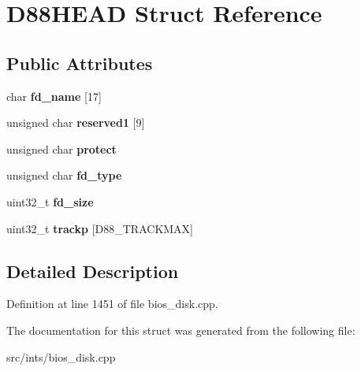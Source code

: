 \hypertarget{structD88HEAD}{\section{D88\-H\-E\-A\-D Struct Reference}
\label{structD88HEAD}
}
\subsection*{Public Attributes}
\begin{DoxyCompactItemize}
\item 
\hypertarget{structD88HEAD_a2c0d333ef195411bba5037f50fd84851}{char {\bfseries fd\-\_\-name} \mbox{[}17\mbox{]}}\label{structD88HEAD_a2c0d333ef195411bba5037f50fd84851}

\item 
\hypertarget{structD88HEAD_a84361ff288bb15c2b0d6f0178ac92307}{unsigned char {\bfseries reserved1} \mbox{[}9\mbox{]}}\label{structD88HEAD_a84361ff288bb15c2b0d6f0178ac92307}

\item 
\hypertarget{structD88HEAD_ae3bd557d9f3ea266a37e5d8e35808169}{unsigned char {\bfseries protect}}\label{structD88HEAD_ae3bd557d9f3ea266a37e5d8e35808169}

\item 
\hypertarget{structD88HEAD_a1d70d36b2a1c7de70b2ea326c60bcbb0}{unsigned char {\bfseries fd\-\_\-type}}\label{structD88HEAD_a1d70d36b2a1c7de70b2ea326c60bcbb0}

\item 
\hypertarget{structD88HEAD_a482cd78a7bd79559ba4982fb5bdadf4e}{uint32\-\_\-t {\bfseries fd\-\_\-size}}\label{structD88HEAD_a482cd78a7bd79559ba4982fb5bdadf4e}

\item 
\hypertarget{structD88HEAD_a7cc91cbeb7f776053cb525dccc7c8abe}{uint32\-\_\-t {\bfseries trackp} \mbox{[}D88\-\_\-\-T\-R\-A\-C\-K\-M\-A\-X\mbox{]}}\label{structD88HEAD_a7cc91cbeb7f776053cb525dccc7c8abe}

\end{DoxyCompactItemize}


\subsection{Detailed Description}


Definition at line 1451 of file bios\-\_\-disk.\-cpp.



The documentation for this struct was generated from the following file\-:\begin{DoxyCompactItemize}
\item 
src/ints/bios\-\_\-disk.\-cpp\end{DoxyCompactItemize}
